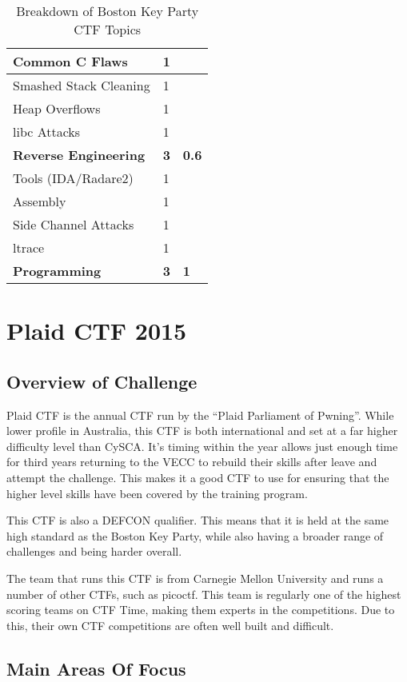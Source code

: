 \documentclass[a4paper,11pt]{report}
\begin{document}
\begin{table}[htb]
\begin{tabular}{| l | l | l |}
				\quad Common C Flaws & 1 & \\ \hline 
				\quad Smashed Stack Cleaning & 1 & \\ \hline 
				\quad Heap Overflows & 1 & \\ \hline 
				\quad libc Attacks & 1 & \\ \hline 
				\textbf{Reverse Engineering} & \textbf{3} & \textbf{0.6} \\ \hline
				\quad Tools (IDA/Radare2) & 1 & \\ \hline 
				\quad Assembly & 1 & \\ \hline 
				\quad Side Channel Attacks & 1 & \\ \hline 
				\quad ltrace & 1 & \\ \hline 
				\textbf{Programming} & \textbf{3} & \textbf{1}\\ \hline
			\end{tabular}
			\caption{Breakdown of Boston Key Party CTF Topics}
			\label{tab:BCTFBreakdown}
		\end{table}
\chapter{Plaid CTF 2015}
	\section{Overview of Challenge}
		Plaid CTF is the annual CTF run by the ``Plaid Parliament of Pwning''. 
		While lower profile in Australia, this CTF is both international and set at a far higher difficulty level than CySCA. 
		It's timing within the year allows just enough time for third years returning to the VECC to rebuild their skills after leave and attempt the challenge. 
		This makes it a good CTF to use for ensuring that the higher level skills have been covered by the training program. 

		This CTF is also a DEFCON qualifier. 
		This means that it is held at the same high standard as the Boston Key Party, while also having a broader range of challenges and being harder overall. 

		The team that runs this CTF is from Carnegie Mellon University and runs a number of other CTFs, such as picoctf. 
		This team is regularly one of the highest scoring teams on CTF Time, making them experts in the competitions. 
		Due to this, their own CTF competitions are often well built and difficult. 
	
	\section{Main Areas Of Focus}
\end{document}
